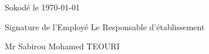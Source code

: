 \documentclass[a4paper, 12pt]{article}
\begin{document}
\begin{flushright}
Sokodé le \today
\end{flushright}\vspace{2mm}



Signature de l'Employé \hspace{6.3cm}  Le Responsable d'établissement


\vspace{1cm}



\begin{minipage}[t]{0.5\textwidth} %
\raggedright %
 
\end{minipage} %
\hfill %
\begin{minipage}[t]{0.4\textwidth} %
\raggedleft %
Mr Sabirou Mohamed TEOURI
  
\end{minipage} %
\end{document}
